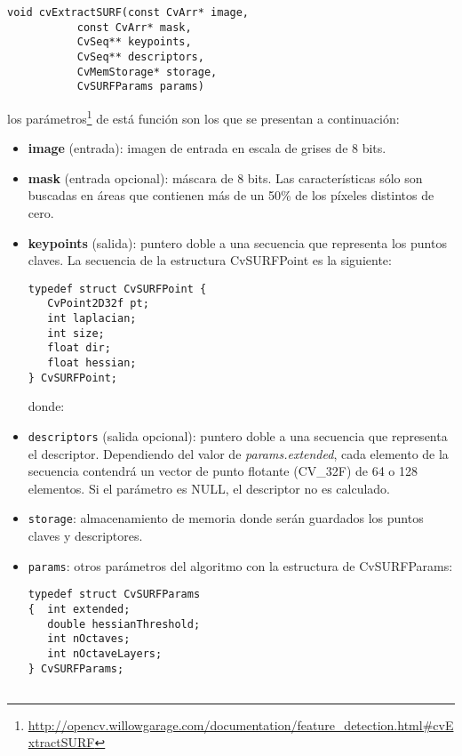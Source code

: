 \documentclass[a4paper,11pt,spanish]{article}
\begin{document}
\begin{lstlisting}
void cvExtractSURF(const CvArr* image, 
		   const CvArr* mask, 
		   CvSeq** keypoints, 
		   CvSeq** descriptors, 
		   CvMemStorage* storage, 
		   CvSURFParams params)
\end{lstlisting}

\noindent los parámetros\footnote{\url{http://opencv.willowgarage.com/documentation/feature_detection.html#cvExtractSURF}} de est\'a funci\'on son los que se presentan a continuación:
\begin{itemize}
 \item \textbf{image} (entrada): imagen de entrada en escala de grises de 8 bits.
 \item \textbf{mask} (entrada opcional): máscara de 8 bits. Las características sólo son buscadas en áreas que contienen más de un 50\% de los píxeles distintos de cero.
  \item \textbf{keypoints} (salida): puntero doble a una secuencia que representa los puntos claves. La secuencia de la estructura CvSURFPoint es la siguiente:
\begin{lstlisting}
typedef struct CvSURFPoint {
   CvPoint2D32f pt;
   int laplacian;
   int size;
   float dir;
   float hessian;
} CvSURFPoint;
\end{lstlisting}
donde:

\item \texttt{descriptors} (salida opcional): puntero doble a una secuencia que representa el descriptor. 
Dependiendo del valor de \emph{params.extended}, cada elemento de la secuencia contendrá un vector de punto flotante (CV\_32F) de 64 o 128 elementos. Si el parámetro es NULL, el descriptor no es calculado.
\item \texttt{storage}: almacenamiento de memoria donde serán guardados los puntos claves y descriptores.
\item \texttt{params}: otros parámetros del algoritmo con la estructura de CvSURFParams:
\begin{lstlisting}
typedef struct CvSURFParams
{  int extended;
   double hessianThreshold;
   int nOctaves;
   int nOctaveLayers;
} CvSURFParams;


\end{lstlisting}
\end{itemize}
\end{document}
